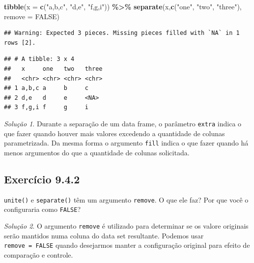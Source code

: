 \documentclass[
]{latex/krantz}
\newenvironment{Shaded}{\begin{snugshade}}{\end{snugshade}}
\newcommand{\AttributeTok}[1]{\textcolor[rgb]{0.13,0.29,0.53}{#1}}
\newcommand{\ConstantTok}[1]{\textcolor[rgb]{0.56,0.35,0.01}{#1}}
\newcommand{\FunctionTok}[1]{\textcolor[rgb]{0.13,0.29,0.53}{\textbf{#1}}}
\newcommand{\NormalTok}[1]{#1}
\newcommand{\SpecialCharTok}[1]{\textcolor[rgb]{0.81,0.36,0.00}{\textbf{#1}}}
\newcommand{\StringTok}[1]{\textcolor[rgb]{0.31,0.60,0.02}{#1}}
\theoremstyle{definition}
\theoremstyle{definition}
\theoremstyle{definition}
\theoremstyle{definition}
\theoremstyle{remark}
\newtheorem*{solution}{Solução}
\begin{document}
\begin{Shaded}
\begin{Highlighting}[]
\FunctionTok{tibble}\NormalTok{(}\AttributeTok{x =} \FunctionTok{c}\NormalTok{(}\StringTok{"a,b,c"}\NormalTok{, }\StringTok{"d,e"}\NormalTok{, }\StringTok{"f,g,i"}\NormalTok{)) }\SpecialCharTok{\%\textgreater{}\%}
  \FunctionTok{separate}\NormalTok{(x,}\FunctionTok{c}\NormalTok{(}\StringTok{"one"}\NormalTok{, }\StringTok{"two"}\NormalTok{, }\StringTok{"three"}\NormalTok{), }\AttributeTok{remove =} \ConstantTok{FALSE}\NormalTok{)}
\end{Highlighting}
\end{Shaded}

\begin{verbatim}
## Warning: Expected 3 pieces. Missing pieces filled with `NA` in 1 rows [2].
\end{verbatim}

\begin{verbatim}
## # A tibble: 3 x 4
##   x     one   two   three
##   <chr> <chr> <chr> <chr>
## 1 a,b,c a     b     c    
## 2 d,e   d     e     <NA> 
## 3 f,g,i f     g     i
\end{verbatim}

\begin{solution}
Durante a separação de um data frame, o parâmetro \texttt{extra} indica o que fazer quando houver mais valores excedendo a quantidade de colunas parametrizada. Da mesma forma o argumento \texttt{fill} indica o que fazer quando há menos argumentos do que a quantidade de colunas solicitada.
\end{solution}

\hypertarget{exr9-4-2}{%
\subsection*{Exercício 9.4.2}\label{exr9-4-2}}

\texttt{unite()} e \texttt{separate()} têm um argumento \texttt{remove}. O que ele faz? Por que você o configuraria como \texttt{FALSE}?

\begin{solution}
O argumento \texttt{remove} é utilizado para determinar se os valore originais serão mantidos numa coluna do data set resultante. Podemos usar \texttt{remove\ =\ FALSE} quando desejarmos manter a configuração original para efeito de comparação e controle.
\end{solution}
\end{document}
